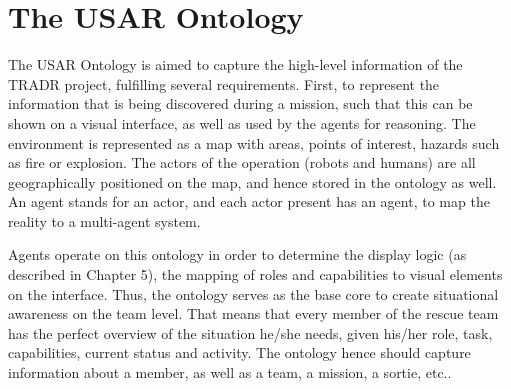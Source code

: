 \chapter{The USAR Ontology}
The USAR Ontology is aimed to capture the high-level information of the TRADR project, fulfilling several requirements. First, to represent the information that is being discovered during a mission, such that this can be shown on a visual interface, as well as used by the agents for reasoning. 
The environment is represented as a map with areas, points of interest, hazards such as fire or explosion. The actors of the operation (robots and humans) are all geographically positioned on the map, and hence stored in the ontology as well. An agent stands for an actor, and each actor present has an agent, to map the reality to a multi-agent system. 

Agents operate on this ontology in order to determine the display logic (as described in Chapter 5), the mapping of roles and capabilities to visual elements on the interface. Thus, the ontology serves as the base core to create situational awareness on the team level. That means that every member of the rescue team has the perfect overview of the situation he/she needs, given his/her role, task, capabilities, current status and activity. The ontology hence should capture information about a member, as well as a team, a mission, a sortie, etc.. 

